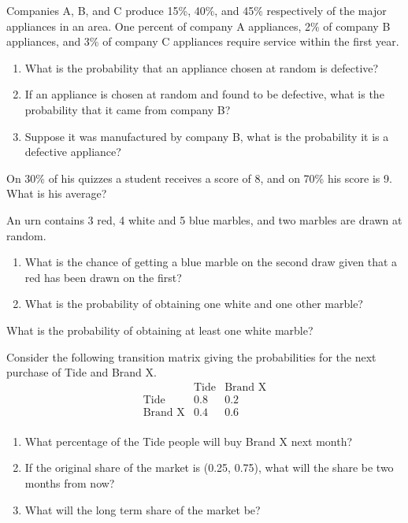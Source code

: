 \begin{puzzle}
    Companies A, B, and C produce 15\%, 40\%, and 45\% respectively of the major appliances in an area. One percent of company A appliances, 2\% of company B appliances, and 3\% of company C appliances require service within the first year.
    \begin{enumerate}
        \item What is the probability that an appliance chosen at random is defective?
        \item If an appliance is chosen at random and found to be defective, what is the probability that it came from company B?
        \item Suppose it was manufactured by company B, what is the probability it is a defective appliance?
    \end{enumerate}
\end{puzzle}


\begin{puzzle}
    On 30\% of his quizzes a student receives a score of 8, and on 70\% his score is 9. What is his average?
\end{puzzle}

\begin{puzzle}
    An urn contains 3 red, 4 white and 5 blue marbles, and two marbles are drawn at random.
    \begin{enumerate}
        \item What is the chance of getting a blue marble on the second draw given that a red has been drawn on the first?
        \item What is the probability of obtaining one white and one other marble?
    \end{enumerate}
\end{puzzle}

\begin{puzzle}
    What is the probability of obtaining at least one white marble?
\end{puzzle}

\begin{puzzle}
    Consider the following transition matrix giving the probabilities for the next purchase of Tide and Brand X.
    \[
        \begin{array}{c|cc}
                           & \text{Tide} & \text{Brand X} \\
            \hline
            \text{Tide}    & 0.8         & 0.2            \\
            \text{Brand X} & 0.4         & 0.6            \\
        \end{array}
    \]
    \begin{enumerate}
        \item What percentage of the Tide people will buy Brand X next month?
        \item If the original share of the market is (0.25, 0.75), what will the share be two months from now?
        \item What will the long term share of the market be?
    \end{enumerate}
\end{puzzle}

